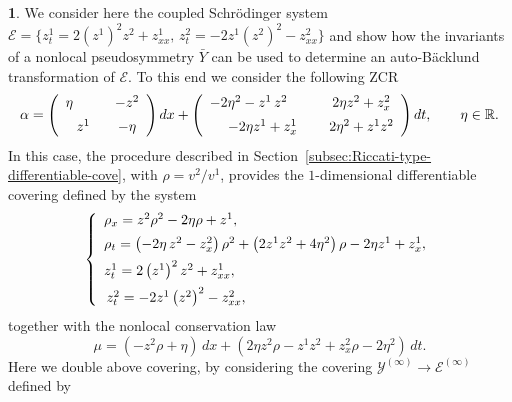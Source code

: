 \documentclass[12pt,english]{elsarticle}
\theoremstyle{plain}
\theoremstyle{plain}
\theoremstyle{remark}
\theoremstyle{plain}
\theoremstyle{definition}
\theoremstyle{definition}
\newtheorem{example}[thm]{\protect\examplename}
\providecommand{\examplename}{Example}
\begin{document}
\begin{example}
\label{exmp35}
We consider here the coupled Schr\"{o}dinger system
$\mathcal{E}=\{z_{t}^{1}=2\left (z^{1}\right )^{2}z^{2}+z_{xx}^{1},\,z_{t}^{2}=-2z^{1}
\left (z^{2}\right )^{2}-z_{xx}^{2}\}$ and show how the invariants of a
nonlocal pseudosymmetry $\bar{Y}$ can be used to determine an auto-B\"{a}cklund
transformation of $\mathcal{E}$. To this end we consider the following
ZCR
%
\begin{equation*}
\alpha =\left (
%
\begin{array}{c@{\quad}c}
\eta \qquad & -z^{2}
\vspace{5pt}
\\
z^{1} & -\eta
\end{array}
%
\right )dx+\left (
%
\begin{array}{c@{\quad}c}
-2\eta ^{2}-z^{1}\,z^{2}\qquad & 2\eta z^{2}+z_{x}^{2}
\vspace{5pt}
\\
-2\eta z^{1}+z_{x}^{1} & 2\eta ^{2}+z^{1}z^{2}
\end{array}
%
\right )dt,\qquad \eta \in \mathbb{R}.
\end{equation*}
%
In this case, the procedure described in Section~\ref{subsec:Riccati-type-differentiable-cove}, with
$\rho =v^{2}/v^{1}$, provides the $1$-dimensional differentiable covering
defined by the system
%
\begin{equation*}
\left \{
%
\begin{array}{l}
\rho _{x}=z^{2}\rho ^{2}-2\eta \rho +z^{1},
\vspace{5pt}
\\
\rho _{t}=\left (-2\eta \,z^{2}-z_{x}^{2}\right )\rho ^{2}+\left (2z^{1}z^{2}+4
\eta ^{2}\right )\rho -2\eta z^{1}+z_{x}^{1},
\vspace{5pt}
\\
z_{t}^{1}=2\left (z^{1}\right )^{2}z^{2}+z_{xx}^{1},
\vspace{5pt}
\\
\,z_{t}^{2}=-2z^{1}\left (z^{2}\right )^{2}-z_{xx}^{2},
\end{array}
%
\right .
\end{equation*}
%
together with the nonlocal conservation law
%
\begin{equation*}
\mu =\left (-z^{2}\rho +\eta \right )\,dx+\left (2\eta z^{2}\rho -z^{1}z^{2}+z_{x}^{2}
\rho -2\eta ^{2}\right )\,dt.
\end{equation*}
%
Here we double above covering, by considering the covering
$\mathcal{Y}^{(\infty )}\rightarrow \mathcal{E}^{(\infty )}$ defined by

\end{example}
\end{document}
